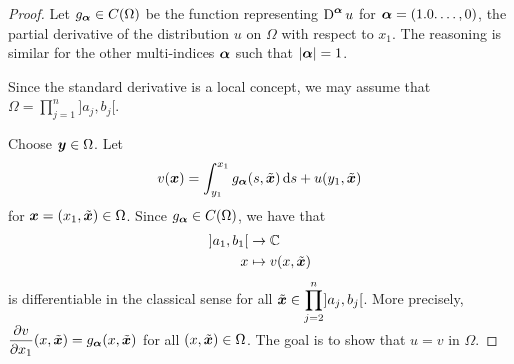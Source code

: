 \begin{proof}
Let $g_{{\bm{\alpha}}} \in C(\Omega)$ be the function representing
$\displaystyle \operatorname{D}^{{\bm{\alpha}}} u$ for ${\bm{\alpha}} = (1.0.\ldots,0)$, the
partial derivative of the distribution $u$ on $\Omega$ with respect to
$x_1$.  The reasoning is similar for the other multi-indices ${\bm{\alpha}}$
such that $|{\bm{\alpha}}|=1$.

Since the standard derivative is a local concept, we may assume that
$\displaystyle \Omega = \prod_{j=1}^n ]a_j,b_j[$.

Choose ${\bm{y}} \in \Omega$. Let
\[
v({\bm{x}}) = \int_{y_1}^{x_1} g_{{\bm{\alpha}}}(s,\tilde{{\bm{x}}}) \,\mathrm{d}{s} +
u(y_1,\tilde{{\bm{x}}})
\]
for ${\bm{x}} = (x_1, \tilde{{\bm{x}}}) \in \Omega$.
Since $g_{{\bm{\alpha}}} \in C(\Omega)$, we have that
\begin{align*}
]a_1,b_1[ & \rightarrow \mathbb{C} \\
x & \mapsto v(x,\tilde{{\bm{x}}})
\end{align*}
is differentiable in the classical sense for all
$\displaystyle \tilde{{\bm{x}}} \in \prod_{j=2}^n ]a_j,b_j[$.
More precisely, $\displaystyle \frac{\partial{v}}{\partial x_1}(x,\tilde{{\bm{x}}}) =
g_{{\bm{\alpha}}}(x,\tilde{{\bm{x}}})$ for all $(x, \tilde{{\bm{x}}}) \in \Omega$.
The goal is to show that $u=v$ in $\Omega$.


\end{proof}
